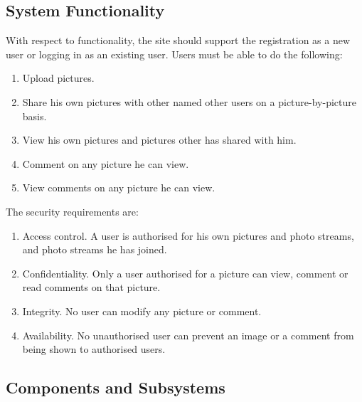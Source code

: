 \documentclass{article}
\begin{document}
\subsection{System Functionality}
With respect to functionality, the site should support the registration as a new user or logging in as an existing user. 
Users must be able to do the following:
\begin{enumerate}
\item Upload pictures. 
\item Share his own pictures with other named other users on a picture-by-picture basis.
\item View his own pictures and pictures other has shared with him.
\item Comment on any picture he can view.
\item View comments on any picture he can view.
\end{enumerate}
The security requirements are:
\begin{enumerate}
\item Access control. A user is authorised for his own pictures and photo streams, and photo streams he has joined.
\item Confidentiality. Only a user authorised for a picture can view, comment or read comments on that picture.
\item Integrity. No user can modify any picture or comment.
\item Availability. No unauthorised user can prevent an image or a comment from being shown to authorised users.
\end{enumerate}

\subsection{Components and Subsystems}
\end{document}
